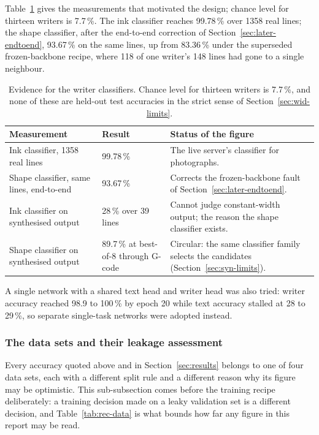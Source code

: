 Table~\ref{tab:wid-results} gives the measurements that motivated the design; chance level for thirteen writers is 7.7\,\%. The ink classifier reaches 99.78\,\% over 1358 real lines; the shape classifier, after the end-to-end correction of Section~\ref{sec:later-endtoend}, 93.67\,\% on the same lines, up from 83.36\,\% under the superseded frozen-backbone recipe, where 118 of one writer's 148 lines had gone to a single neighbour.

\begin{table}[!htbp]
\centering
\fontsize{8}{9.6}\selectfont
\setlength{\tabcolsep}{3.5pt}
\begin{tabularx}{\linewidth}{|p{3.1cm}|p{1.9cm}|X|}
\hline
\textbf{Measurement} & \textbf{Result} & \textbf{Status of the figure} \\
\hline
Ink classifier, 1358 real lines & 99.78\,\% & The live server's classifier for photographs. \\
\hline
Shape classifier, same lines, end-to-end & 93.67\,\% & Corrects the frozen-backbone fault of Section~\ref{sec:later-endtoend}. \\
\hline
Ink classifier on synthesised output & 28\,\% over 39 lines & Cannot judge constant-width output; the reason the shape classifier exists. \\
\hline
Shape classifier on synthesised output & 89.7\,\% at best-of-8 through G-code & Circular: the same classifier family selects the candidates (Section~\ref{sec:syn-limits}). \\
\hline
\end{tabularx}
\caption{Evidence for the writer classifiers. Chance level for thirteen writers is 7.7\,\%, and none of these are held-out test accuracies in the strict sense of Section~\ref{sec:wid-limits}.}
\label{tab:wid-results}
\end{table}

A single network with a shared text head and writer head was also tried: writer accuracy reached 98.9 to 100\,\% by epoch 20 while text accuracy stalled at 28 to 29\,\%, so separate single-task networks were adopted instead.

\subsubsection{The data sets and their leakage assessment}
\label{sec:rec-data}

Every accuracy quoted above and in Section~\ref{sec:results} belongs to one of four data sets, each with a different split rule and a different reason why its figure may be optimistic. This sub-subsection comes before the training recipe deliberately: a training decision made on a leaky validation set is a different decision, and Table~\ref{tab:rec-data} is what bounds how far any figure in this report may be read.

